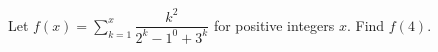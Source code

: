 Let $f(x)=\displaystyle\sum_{k=1}^{x}\dfrac{k^2}{2^k-1^0+3^k}$ for positive integers $x$. Find $f(4)$.
